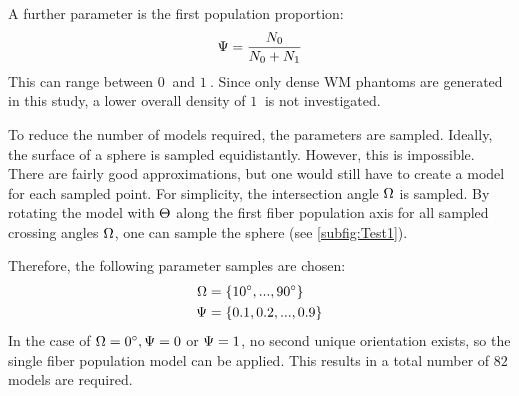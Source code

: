 \par
% 
A further parameter is the first population proportion:
\begin{align}
    \textnormal{$\Psi$}=\frac{N_0}{N_0+N_1}
\end{align}
This can range between $\SI{0}{}$ and $\SI{1}{}$.
Since only dense \ac{WM} phantoms are generated in this study, a lower overall density of $\SI{1}{}$ is not investigated.
\par
%
To reduce the number of models required, the parameters are sampled.
Ideally, the surface of a sphere is sampled equidistantly.
However, this is impossible.
There are fairly good approximations, but one would still have to create a model for each sampled point.
For simplicity, the intersection angle $\textnormal{$\Omega$}$ is sampled.
By rotating the model with $\textnormal{$\Theta$}$ along the first fiber population axis for all sampled crossing angles $\textnormal{$\Omega$}$, one can sample the sphere (see \cref{subfig:Test1}).
\par
% 
Therefore, the following parameter samples are chosen:
% 
\begin{align}
    \begin{split}
        \textnormal{$\Omega$} &= \{\SI{10}{\degree}, ..., \SI{90}{\degree}\}\\
        \textnormal{$\Psi$} &= \{\SI{0.1}{}, \SI{0.2}{}, ..., \SI{0.9}{}\}
    \end{split}
\end{align}
% 
In the case of $\textnormal{$\Omega$} = \SI{0}{\degree}, \textnormal{$\Psi$} = 0$ or $\textnormal{$\Psi$} = 1$, no second unique orientation exists, so the single fiber population model can be applied.
This results in a total number of $\SI{82}{}$ models are required.
%
% 
% 
